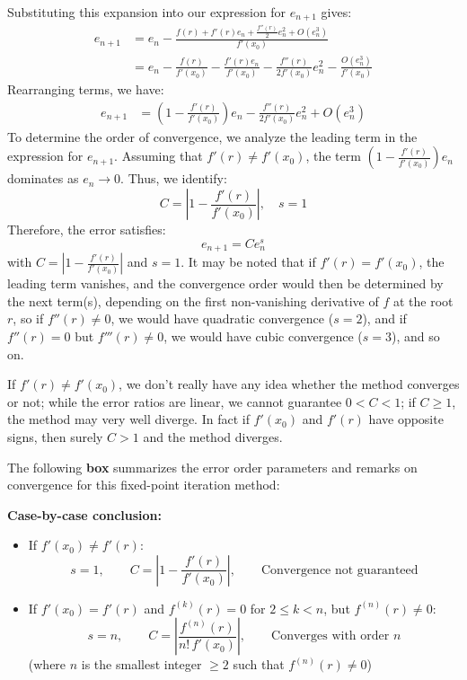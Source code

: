 Substituting this expansion into our expression for $e_{n+1}$ gives:
\begin{align*}
    e_{n+1} &= e_n - \frac{f(r) + f'(r)e_n + \frac{f''(r)}{2}e_n^2 + O(e_n^3)}{f'(x_0)} \\
    &= e_n - \frac{f(r)}{f'(x_0)} - \frac{f'(r)e_n}{f'(x_0)} - \frac{f''(r)}{2f'(x_0)}e_n^2 - \frac{O(e_n^3)}{f'(x_0)}
\end{align*}
Rearranging terms, we have:
\begin{align*}
    e_{n+1} &= \left(1 - \frac{f'(r)}{f'(x_0)}\right)e_n - \frac{f''(r)}{2f'(x_0)}e_n^2 + O(e_n^3)
\end{align*}
To determine the order of convergence, we analyze the leading term in the expression for $e_{n+1}$. Assuming that $f'(r) \neq f'(x_0)$, the term $\left(1 - \frac{f'(r)}{f'(x_0)}\right)e_n$ dominates as $e_n \to 0$. Thus, we identify:
\begin{equation*}
    C = \left|1 - \frac{f'(r)}{f'(x_0)}\right|, \quad s = 1
\end{equation*}
Therefore, the error satisfies:
\begin{equation*}
    e_{n+1} = C e_n^s
\end{equation*}
with $C = \left|1 - \frac{f'(r)}{f'(x_0)}\right|$ and $s = 1$.
It may be noted that if $f'(r) = f'(x_0)$, the leading term vanishes, and the convergence order would then be determined by the next term(s), depending on the first non-vanishing derivative of $f$ at the root $r$, so if $f''(r) \neq 0$, we would have quadratic convergence ($s = 2$), and if $f''(r) = 0$ but $f'''(r) \neq 0$, we would have cubic convergence ($s = 3$), and so on.

If $f'(r) \neq f'(x_0)$, we don't really have any idea whether the method converges or not; while the error ratios are linear, we cannot guarantee $0 < C < 1$; if $C \geq 1$, the method may very well diverge. In fact if $f'(x_0)$ and $f'(r)$ have opposite signs, then surely $C > 1$ and the method diverges.


The following \textbf{box} summarizes the error order parameters and remarks on convergence for this fixed-point iteration method:

\begin{tcolorbox}[colback=gray!10!white, colframe=black!80!white, title=Convergence Summary]
\textbf{Case-by-case conclusion:}

\begin{itemize}
    \item If $f'(x_0) \neq f'(r)$:
    \[
        s = 1, \qquad C = \left|1 - \frac{f'(r)}{f'(x_0)}\right|, \qquad \text{Convergence not guaranteed}
    \]
    \item If $f'(x_0) = f'(r)$ and $f^{(k)}(r) = 0$ for $2 \leq k < n$, but $f^{(n)}(r) \neq 0$:
    \[
        s = n, \qquad C = \left|\frac{f^{(n)}(r)}{n!\,f'(x_0)}\right|, \qquad \text{Converges with order } n
    \]
    (where $n$ is the smallest integer $\geq 2$ such that $f^{(n)}(r) \neq 0$)
\end{itemize}

\end{tcolorbox}

